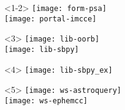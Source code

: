 \begin{frame}
\begin{columns}[T]
\begin{column}{.4\textwidth}
\begin{overlayarea}{\textwidth}{\textheight}
        \begin{onlyenv}<1-2>
          \texttt{[image: form-psa]}\\
          \vspace{1.0em}
          \texttt{[image: portal-imcce]}\\
          \vspace{1.0em}
        \end{onlyenv}

        \begin{onlyenv}<3>
          \vspace{-1.5em}
          \texttt{[image: lib-oorb]}\\
          \texttt{[image: lib-sbpy]}
        \end{onlyenv}

        \begin{onlyenv}<4>
          \hspace*{-3.0em}\texttt{[image: lib-sbpy\_ex]}
        \end{onlyenv}

        \begin{onlyenv}<5>
          \texttt{[image: ws-astroquery]}\\
          \vspace{1.0em}
          \hspace*{-3em}\texttt{[image: ws-ephemcc]}
        \end{onlyenv}

      \end{overlayarea}
    \end{column}

  \end{columns}

\end{frame}


